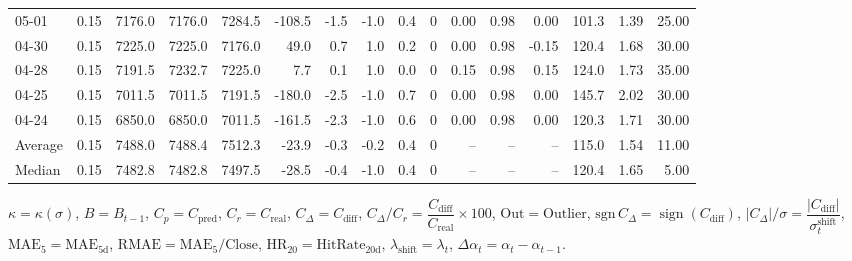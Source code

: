 \begin{threeparttable}
{\begin{tabular}{lrrrrrrrrrrrrrrr}
  05-01 &     0.15 & 7176.0 & 7176.0 & 7284.5 &     -108.5 &           -1.5 &                     -1.0 &                 0.4 &              0 &       0.00 &      0.98 &           0.00 &            101.3 &            1.39 &                  25.00 \\
  04-30 &     0.15 & 7225.0 & 7225.0 & 7176.0 &       49.0 &            0.7 &                      1.0 &                 0.2 &              0 &       0.00 &      0.98 &          -0.15 &            120.4 &            1.68 &                  30.00 \\
  04-28 &     0.15 & 7191.5 & 7232.7 & 7225.0 &        7.7 &            0.1 &                      1.0 &                 0.0 &              0 &       0.15 &      0.98 &           0.15 &            124.0 &            1.73 &                  35.00 \\
  04-25 &     0.15 & 7011.5 & 7011.5 & 7191.5 &     -180.0 &           -2.5 &                     -1.0 &                 0.7 &              0 &       0.00 &      0.98 &           0.00 &            145.7 &            2.02 &                  30.00 \\
  04-24 &     0.15 & 6850.0 & 6850.0 & 7011.5 &     -161.5 &           -2.3 &                     -1.0 &                 0.6 &              0 &       0.00 &      0.98 &           0.00 &            120.3 &            1.71 &                  30.00 \\
Average &     0.15 & 7488.0 & 7488.4 & 7512.3 &      -23.9 &           -0.3 &                     -0.2 &                 0.4 &              0 &         -- &        -- &             -- &            115.0 &            1.54 &                  11.00 \\
 Median &     0.15 & 7482.8 & 7482.8 & 7497.5 &      -28.5 &           -0.4 &                     -1.0 &                 0.4 &              0 &         -- &        -- &             -- &            120.4 &            1.65 &                   5.00 \\
\bottomrule
\end{tabular}
}
\begin{tablenotes}\footnotesize
\item $\kappa=\kappa(\sigma)$, $B=B_{t-1}$, $C_p=C_{\text{pred}}$, $C_r=C_{\text{real}}$, $C_\Delta=C_{\text{diff}}$, $C_\Delta/C_r=\dfrac{C_{\text{diff}}}{C_{\text{real}}}\times100$, $\mathrm{Out}=\text{Outlier}$, $\mathrm{sgn}\,C_\Delta=\operatorname{sign}(C_{\text{diff}})$, $|C_\Delta|/\sigma=\dfrac{|C_{\text{diff}}|}{\sigma_t^{\text{shift}}}$, $\mathrm{MAE}_5=\mathrm{MAE}_{5\text{d}}$, $\mathrm{RMAE}= \mathrm{MAE}_5 / \text{Close}$, $\mathrm{HR}_{20}=\mathrm{HitRate}_{20\text{d}}$, 
$\lambda_{\text{shift}}=\lambda_t$, 
$\Delta\alpha_t=\alpha_t-\alpha_{t-1}$.
\end{tablenotes}
\end{threeparttable}
\endgroup

